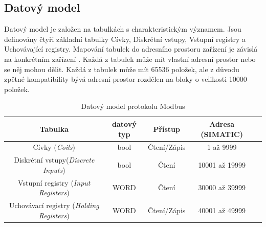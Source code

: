\documentclass[a4paper,12pt,czech,bibliography=totoc]{scrbook}
\begin{document}
\subsection{Datový model}
Datový model je založen na tabulkách s charakteristickým významem. Jsou definovány čtyři základní tabulky Cívky, Diskrétní vstupy, Vstupní registry a Uchovávající registry. Mapování tabulek do adresního prostoru zařízení je závislá na konkrétním zařízení . Každá z tabulek může mít vlastní adresní prostor nebo se něj mohou dělit. Každá z tabulek může mít 65536 položek, ale z důvodu zpětné kompatibility bývá adresní prostor rozdělen na bloky o velikosti 10000 položek.
\begin{table}[h]
\centering
\begin{tabular}[h]{|c|c|c|c|c|}
	\hline
	\textbf{Tabulka} & \textbf{datový typ} & \textbf{Přístup} &\textbf{Adresa (SIMATIC)}\\
	\hline
	Cívky (\textit{Coils}) & bool & Čtení/Zápis & 1 až 9999\\  
	Diskrétní vstupy(\textit{Discrete Inputs}) & bool & Čtení & 10001 až 19999  \\
	Vstupní registry (\textit{Input Registers}) & WORD & Čtení & 30000 až 39999  \\
	Uchovávací registry (\textit{Holding Registers}) & WORD & Čtení/Zápis & 40001 až 49999 \\ \hline
\end{tabular}
\caption{Datový model protokolu Modbus}
\label{tab:my_label}
\end{table}
\end{document}
